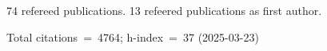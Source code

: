 74 refereed publications. 13 refeered publications as first author.

Total citations~=~4764; h-index~=~37 (2025-03-23)
